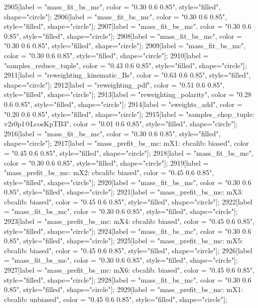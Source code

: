 {	2905[label = "mass_fit_bs_mc", color = "0.30 0.6 0.85", style="filled", shape="circle"];
	2906[label = "mass_fit_bs_mc", color = "0.30 0.6 0.85", style="filled", shape="circle"];
	2907[label = "mass_fit_bs_mc", color = "0.30 0.6 0.85", style="filled", shape="circle"];
	2908[label = "mass_fit_bs_mc", color = "0.30 0.6 0.85", style="filled", shape="circle"];
	2909[label = "mass_fit_bs_mc", color = "0.30 0.6 0.85", style="filled", shape="circle"];
	2910[label = "samples_reduce_tuple", color = "0.43 0.6 0.85", style="filled", shape="circle"];
	2911[label = "reweighting_kinematic_Bs", color = "0.63 0.6 0.85", style="filled", shape="circle"];
	2912[label = "reweighting_pdf", color = "0.51 0.6 0.85", style="filled", shape="circle"];
	2913[label = "reweighting_polarity", color = "0.28 0.6 0.85", style="filled", shape="circle"];
	2914[label = "sweights_add", color = "0.20 0.6 0.85", style="filled", shape="circle"];
	2915[label = "samples_chop_tuple\nversion: v2r0p1@LcosKpTB3", color = "0.01 0.6 0.85", style="filled", shape="circle"];
	2916[label = "mass_fit_bs_mc", color = "0.30 0.6 0.85", style="filled", shape="circle"];
	2917[label = "mass_prefit_bs_mc\nmassbin: mX1\nmassmodel: cbcalib\ntrigger: biased", color = "0.45 0.6 0.85", style="filled", shape="circle"];
	2918[label = "mass_fit_bs_mc", color = "0.30 0.6 0.85", style="filled", shape="circle"];
	2919[label = "mass_prefit_bs_mc\nmassbin: mX2\nmassmodel: cbcalib\ntrigger: biased", color = "0.45 0.6 0.85", style="filled", shape="circle"];
	2920[label = "mass_fit_bs_mc", color = "0.30 0.6 0.85", style="filled", shape="circle"];
	2921[label = "mass_prefit_bs_mc\nmassbin: mX3\nmassmodel: cbcalib\ntrigger: biased", color = "0.45 0.6 0.85", style="filled", shape="circle"];
	2922[label = "mass_fit_bs_mc", color = "0.30 0.6 0.85", style="filled", shape="circle"];
	2923[label = "mass_prefit_bs_mc\nmassbin: mX4\nmassmodel: cbcalib\ntrigger: biased", color = "0.45 0.6 0.85", style="filled", shape="circle"];
	2924[label = "mass_fit_bs_mc", color = "0.30 0.6 0.85", style="filled", shape="circle"];
	2925[label = "mass_prefit_bs_mc\nmassbin: mX5\nmassmodel: cbcalib\ntrigger: biased", color = "0.45 0.6 0.85", style="filled", shape="circle"];
	2926[label = "mass_fit_bs_mc", color = "0.30 0.6 0.85", style="filled", shape="circle"];
	2927[label = "mass_prefit_bs_mc\nmassbin: mX6\nmassmodel: cbcalib\ntrigger: biased", color = "0.45 0.6 0.85", style="filled", shape="circle"];
	2928[label = "mass_fit_bs_mc", color = "0.30 0.6 0.85", style="filled", shape="circle"];
	2929[label = "mass_prefit_bs_mc\nmassbin: mX1\nmassmodel: cbcalib\ntrigger: unbiased", color = "0.45 0.6 0.85", style="filled", shape="circle"];
}
